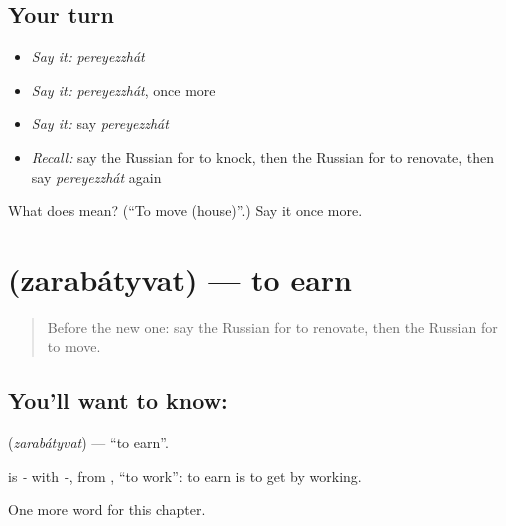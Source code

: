 \subsection*{Your turn}
\begin{itemize}
\raggedright
  \item \emph{Say it:} \emph{pereyezzhát}
  \item \emph{Say it:} \emph{pereyezzhát}, once more
  \item \emph{Say it:} say \emph{pereyezzhát}
  \item \emph{Recall:} say the Russian for to knock, then the Russian for to renovate, then say \emph{pereyezzhát} again
\end{itemize}

\begin{tcolorbox}[breakable,colback=teal!4,colframe=teal!35!black,title={Before you move on}]
What does  mean? (\textquotedblleft{}To move (house)\textquotedblright{}.) Say it once more.
\end{tcolorbox}
\section[\texorpdfstring{\ru{зарабатывать} (zarabátyvat)}{зарабатывать (zarabátyvat)}]{ (zarabátyvat) — to earn}

\label{lesson:RU-C237-zarabatyvat}



\begin{quote}
Before the new one: say the Russian for to renovate, then the Russian for to move.
\end{quote}

\subsection*{You'll want to know: }
\textbf{} (\emph{zarabátyvat}) — \textquotedblleft{}to earn\textquotedblright{}.

\begin{cousinweb}
\textbf{} is \emph{-} with \emph{-}, from \emph{}, \textquotedblleft{}to work\textquotedblright{}: to earn is to get by working.
\end{cousinweb}

\begin{grammarlens}[title={What you've built}]
One more word for this chapter.
\end{grammarlens}

